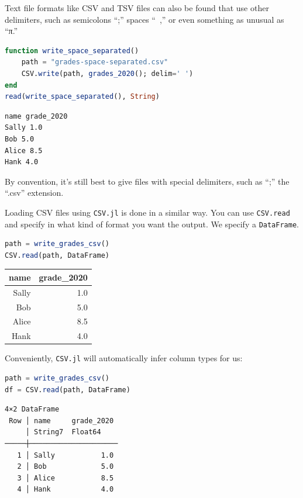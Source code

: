 \documentclass[
  notoc %
]{tufte-book}
\newcommand{\passthrough}[1]{#1}
\begin{document}
Text file formats like CSV and TSV files can also be found that use
other delimiters, such as semicolons ``;'' spaces ``~,'' or even
something as unusual as ``π.''

\begin{lstlisting}[language=Julia]
function write_space_separated()
    path = "grades-space-separated.csv"
    CSV.write(path, grades_2020(); delim=' ')
end
read(write_space_separated(), String)
\end{lstlisting}

\begin{lstlisting}[language=Output]
name grade_2020
Sally 1.0
Bob 5.0
Alice 8.5
Hank 4.0

\end{lstlisting}

By convention, it's still best to give files with special delimiters,
such as ``;'' the ``.csv'' extension.

Loading CSV files using \passthrough{\lstinline!CSV.jl!} is done in a
similar way. You can use \passthrough{\lstinline!CSV.read!} and specify
in what kind of format you want the output. We specify a
\passthrough{\lstinline!DataFrame!}.

\begin{lstlisting}[language=Julia]
path = write_grades_csv()
CSV.read(path, DataFrame)
\end{lstlisting}

\begin{longtable}[]{@{}rr@{}}
\toprule
name & grade\_2020 \\
\midrule
\endhead
Sally & 1.0 \\
Bob & 5.0 \\
Alice & 8.5 \\
Hank & 4.0 \\
\bottomrule
\end{longtable}

Conveniently, \passthrough{\lstinline!CSV.jl!} will automatically infer
column types for us:

\begin{lstlisting}[language=Julia]
path = write_grades_csv()
df = CSV.read(path, DataFrame)
\end{lstlisting}

\begin{lstlisting}[language=Output]
4×2 DataFrame
 Row │ name     grade_2020
     │ String7  Float64
─────┼─────────────────────
   1 │ Sally           1.0
   2 │ Bob             5.0
   3 │ Alice           8.5
   4 │ Hank            4.0
\end{lstlisting}
\end{document}
